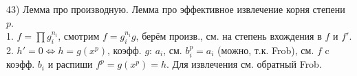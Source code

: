 43) Лемма про производную. Лемма про эффективное извлечение корня степени $p$.\\
1. $f=\prod g_i^{n_i}$, смотрим $f=g_i^{n_i}g$, берём произв., см. на степень вхождения в $f$ и $f'$. 2. $h'=0 \Leftrightarrow h=g(x^p)$, коэфф. $g$: $a_i$, см. $b_i^p=a_i$ (можно, т.к. Frob), см. $f$ c коэфф. $b_i$ и распиши $f^p=g(x^p)=h$. Для извлечения см. обратный Frob.\\
